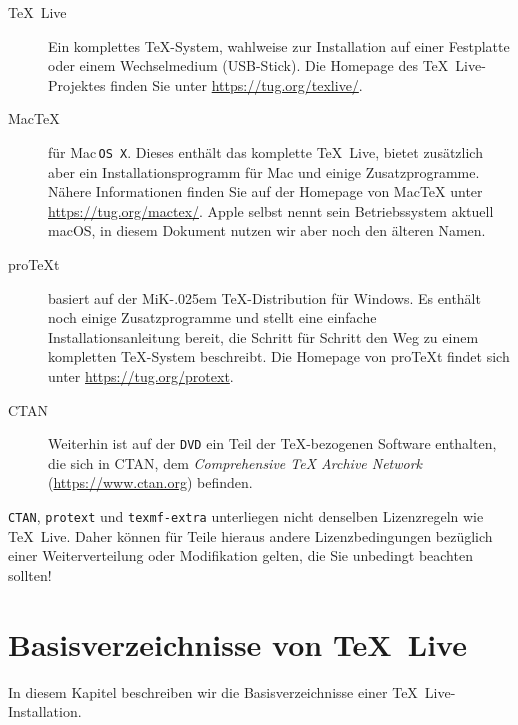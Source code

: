 \documentclass[12pt,ngerman,a4paper,fullparskip]{scrreprt}
\newcommand{\TL}{\TeX\ Live\xspace}
\newcommand{\acro}[1]{\texttt{#1}}
\newcommand{\dirname}[1]{\texttt{#1}}
\newcommand{\pkgname}[1]{\texttt{#1}}
\newcommand\MIKTEX{MiK\kern-.025em \TeX}%
\providecommand*{\CTAN}{\acro{CTAN}\xspace}
\providecommand*{\DVD}{\acro{DVD}\xspace}
\providecommand*{\MacOSX}{Mac\,\acro{OS\,X}\xspace}
\begin{document}
\begin{description}
\item[\TL] Ein komplettes \TeX-System, wahlweise zur Installation auf einer Festplatte oder einem Wechselmedium (USB-Stick). Die Homepage des \TL-Projektes finden Sie unter \url{https://tug.org/texlive/}.
\item[Mac\TeX] für \MacOSX. Dieses enthält das komplette \TL, bietet zusätzlich aber ein Installationsprogramm für Mac und einige Zusatzprogramme. Nähere Informationen finden Sie auf der Homepage von Mac\TeX{} unter \url{https://tug.org/mactex/}. Apple selbst nennt sein Betriebssystem aktuell macOS, in diesem Dokument nutzen wir aber noch den älteren Namen.
\item[pro\TeX{}t] basiert auf der \MIKTEX-Distribution für Windows. Es enthält noch einige Zusatzprogramme und stellt eine einfache Installationsanleitung bereit, die Schritt für Schritt den Weg zu einem kompletten \TeX-System beschreibt. Die Homepage von pro\TeX{}t findet sich unter \url{https://tug.org/protext}. 
\item[CTAN] Weiterhin ist auf der \DVD{} ein Teil der \TeX-bezogenen Software enthalten, die sich
in CTAN, dem \emph{Comprehensive \TeX{} Archive Network} (\url{https://www.ctan.org}) befinden.
\end{description}

\CTAN{}, \pkgname{protext} und \dirname{texmf-extra} unterliegen nicht denselben Lizenzregeln wie \TL. Daher können für Teile hieraus andere Lizenzbedingungen bezüglich einer Weiterverteilung oder
Modifikation gelten, die Sie unbedingt beachten sollten!

\section{Basisverzeichnisse von \TL}\label{sec:tld}

In diesem Kapitel beschreiben wir die Basisverzeichnisse einer \TL-Installation.
\end{document}
